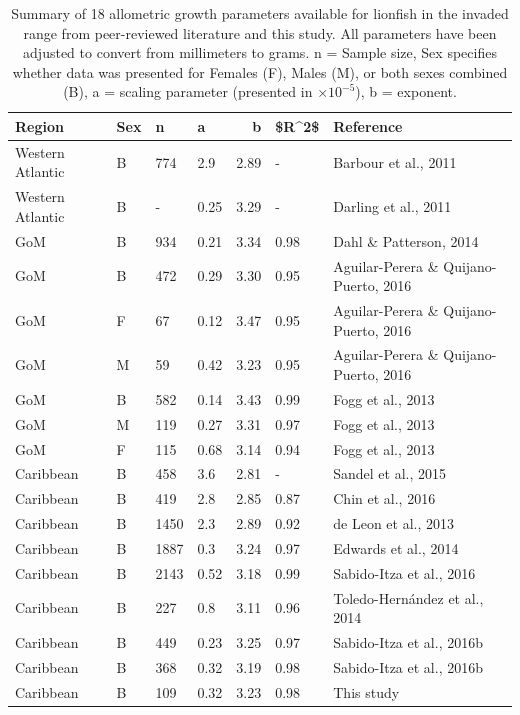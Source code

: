 \documentclass[fleqn,10pt,lineno]{wlpeerj} %
\begin{document}
\begin{table}[t]

\caption{\label{tab:unnamed-chunk-2}\label{tab:all_params}Summary of 18 allometric growth parameters available for lionfish in the invaded range from peer-reviewed literature and this study. All parameters have been adjusted to convert from millimeters to grams. n = Sample size, Sex specifies whether data was presented for Females (F), Males (M), or both sexes combined (B), a = scaling parameter (presented in $\times 10^{-5}$), b = exponent.}
\centering
\begin{tabular}{llllrll}
\toprule
Region & Sex & n & a & b & \$R\textasciicircum{}2\$ & Reference\\
\midrule
Western Atlantic & B & 774 & 2.9 & 2.89 & - & Barbour et al., 2011\\
Western Atlantic & B & - & 0.25 & 3.29 & - & Darling et al., 2011\\
GoM & B & 934 & 0.21 & 3.34 & 0.98 & Dahl \& Patterson, 2014\\
GoM & B & 472 & 0.29 & 3.30 & 0.95 & Aguilar-Perera \& Quijano-Puerto, 2016\\
GoM & F & 67 & 0.12 & 3.47 & 0.95 & Aguilar-Perera \& Quijano-Puerto, 2016\\
\addlinespace
GoM & M & 59 & 0.42 & 3.23 & 0.95 & Aguilar-Perera \& Quijano-Puerto, 2016\\
GoM & B & 582 & 0.14 & 3.43 & 0.99 & Fogg et al., 2013\\
GoM & M & 119 & 0.27 & 3.31 & 0.97 & Fogg et al., 2013\\
GoM & F & 115 & 0.68 & 3.14 & 0.94 & Fogg et al., 2013\\
Caribbean & B & 458 & 3.6 & 2.81 & - & Sandel et al., 2015\\
\addlinespace
Caribbean & B & 419 & 2.8 & 2.85 & 0.87 & Chin et al., 2016\\
Caribbean & B & 1450 & 2.3 & 2.89 & 0.92 & de Leon et al., 2013\\
Caribbean & B & 1887 & 0.3 & 3.24 & 0.97 & Edwards et al., 2014\\
Caribbean & B & 2143 & 0.52 & 3.18 & 0.99 & Sabido-Itza et al., 2016\\
Caribbean & B & 227 & 0.8 & 3.11 & 0.96 & Toledo-Hernández et al., 2014\\
\addlinespace
Caribbean & B & 449 & 0.23 & 3.25 & 0.97 & Sabido-Itza et al., 2016b\\
Caribbean & B & 368 & 0.32 & 3.19 & 0.98 & Sabido-Itza et al., 2016b\\
Caribbean & B & 109 & 0.32 & 3.23 & 0.98 & This study\\
\bottomrule
\end{tabular}
\end{table}
\end{document}
